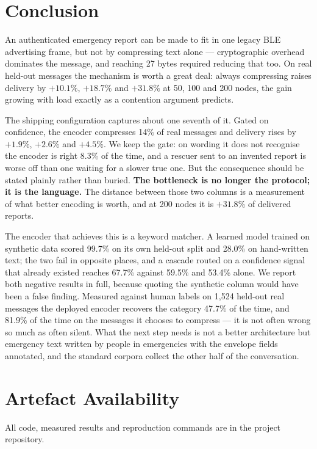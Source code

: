 \documentclass[conference]{IEEEtran}
\begin{document}
\section{Conclusion}

An authenticated emergency report can be made to fit in one legacy BLE
advertising frame, but not by compressing text alone --- cryptographic
overhead dominates the message, and reaching 27 bytes required reducing that
too. On real held-out messages the mechanism is worth a great deal: always
compressing raises delivery by $+10.1\%$, $+18.7\%$ and $+31.8\%$ at 50, 100
and 200 nodes, the gain growing with load exactly as a contention argument
predicts.

The shipping configuration captures about one seventh of it. Gated on
confidence, the encoder compresses 14\% of real messages and delivery rises
by $+1.9\%$, $+2.6\%$ and $+4.5\%$. We keep the gate: on wording it does not
recognise the encoder is right 8.3\% of the time, and a rescuer sent to an
invented report is worse off than one waiting for a slower true one. But the
consequence should be stated plainly rather than buried. \textbf{The
bottleneck is no longer the protocol; it is the language.} The distance
between those two columns is a measurement of what better encoding is worth,
and at 200 nodes it is $+31.8\%$ of delivered reports.

The encoder that achieves this is a keyword matcher. A learned model trained
on synthetic data scored 99.7\% on its own held-out split and 28.0\% on
hand-written text; the two fail in opposite places, and a cascade routed on a
confidence signal that already existed reaches 67.7\% against 59.5\% and
53.4\% alone. We report both negative results in full, because quoting the
synthetic column would have been a false finding. Measured against human
labels on 1{,}524 held-out real messages the deployed encoder recovers the
category 47.7\% of the time, and 81.9\% of the time on the messages it
chooses to compress --- it is not often wrong so much as often silent. What
the next step needs is not a better architecture but emergency text written
by people in emergencies with the envelope fields annotated, and the standard
corpora collect the other half of the conversation.

\section*{Artefact Availability}
All code, measured results and reproduction commands are in the project
repository.
\end{document}
